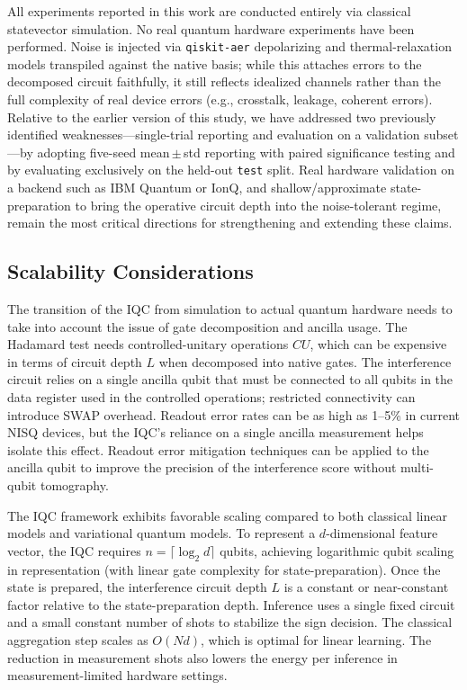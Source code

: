 \documentclass[conference]{IEEEtran}
\begin{document}
All experiments reported in this work are conducted entirely via classical statevector simulation. No real quantum hardware experiments have been performed. Noise is injected via \texttt{qiskit-aer} depolarizing and thermal-relaxation models transpiled against the native basis; while this attaches errors to the decomposed circuit faithfully, it still reflects idealized channels rather than the full complexity of real device errors (e.g., crosstalk, leakage, coherent errors). Relative to the earlier version of this study, we have addressed two previously identified weaknesses---single-trial reporting and evaluation on a validation subset---by adopting five-seed mean\,$\pm$\,std reporting with paired significance testing and by evaluating exclusively on the held-out \texttt{test} split. Real hardware validation on a backend such as IBM Quantum or IonQ, and shallow/approximate state-preparation to bring the operative circuit depth into the noise-tolerant regime, remain the most critical directions for strengthening and extending these claims.

\subsection{Scalability Considerations}
The transition of the IQC from simulation to actual quantum hardware needs to take into account the issue of gate decomposition and ancilla usage. The Hadamard test needs controlled-unitary operations $CU$, which can be expensive in terms of circuit depth $L$ when decomposed into native gates. The interference circuit relies on a single ancilla qubit that must be connected to all qubits in the data register used in the controlled operations; restricted connectivity can introduce SWAP overhead. Readout error rates can be as high as 1--5\% in current NISQ devices, but the IQC's reliance on a single ancilla measurement helps isolate this effect. Readout error mitigation techniques can be applied to the ancilla qubit to improve the precision of the interference score without multi-qubit tomography.

The IQC framework exhibits favorable scaling compared to both classical linear models and variational quantum models. To represent a $d$-dimensional feature vector, the IQC requires $n = \lceil \log_2 d \rceil$ qubits, achieving logarithmic qubit scaling in representation (with linear gate complexity for state-preparation). Once the state is prepared, the interference circuit depth $L$ is a constant or near-constant factor relative to the state-preparation depth. Inference uses a single fixed circuit and a small constant number of shots to stabilize the sign decision. The classical aggregation step scales as $O(Nd)$, which is optimal for linear learning. The reduction in measurement shots also lowers the energy per inference in measurement-limited hardware settings.
\end{document}
